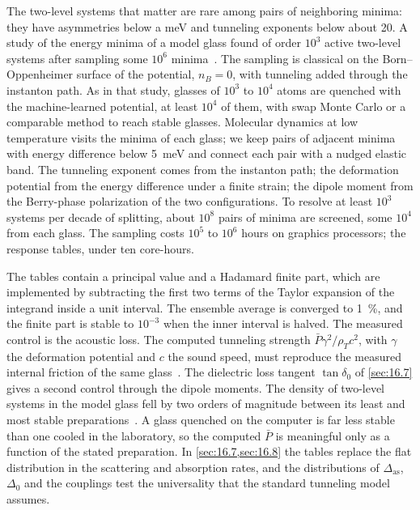 The two-level systems that matter are rare among pairs of neighboring minima: they have asymmetries below a meV and tunneling exponents below about 20. A study of the energy minima of a model glass found of order $10^3$ active two-level systems after sampling some $10^6$ minima~\cite{khomenko2020depletion}. The sampling is classical on the Born--Oppenheimer surface of the potential, $n_B = 0$, with tunneling added through the instanton path. As in that study, glasses of $10^3$ to $10^4$ atoms are quenched with the machine-learned potential, at least $10^4$ of them, with swap Monte Carlo or a comparable method to reach stable glasses. Molecular dynamics at low temperature visits the minima of each glass; we keep pairs of adjacent minima with energy difference below \SI{5}{meV} and connect each pair with a nudged elastic band. The tunneling exponent comes from the instanton path; the deformation potential from the energy difference under a finite strain; the dipole moment from the Berry-phase polarization of the two configurations. To resolve at least $10^3$ systems per decade of splitting, about $10^8$ pairs of minima are screened, some $10^4$ from each glass. The sampling costs $10^5$ to $10^6$ hours on graphics processors; the response tables, under ten core-hours.

The tables contain a principal value and a Hadamard finite part, which are implemented by subtracting the first two terms of the Taylor expansion of the integrand inside a unit interval. The ensemble average is converged to \SI{1}{\percent}, and the finite part is stable to $10^{-3}$ when the inner interval is halved. The measured control is the acoustic loss. The computed tunneling strength $\bar P\gamma^2/\rho_Tc^2$, with $\gamma$ the deformation potential and $c$ the sound speed, must reproduce the measured internal friction of the same glass~\cite{phillips1987two}. The dielectric loss tangent $\tan\delta_0$ of \cref{sec:16.7} gives a second control through the dipole moments. The density of two-level systems in the model glass fell by two orders of magnitude between its least and most stable preparations~\cite{khomenko2020depletion}. A glass quenched on the computer is far less stable than one cooled in the laboratory, so the computed $\bar P$ is meaningful only as a function of the stated preparation. In \cref{sec:16.7,sec:16.8} the tables replace the flat distribution in the scattering and absorption rates, and the distributions of $\Delta_{\mathrm{as}}$, $\Delta_0$ and the couplings test the universality that the standard tunneling model assumes.

